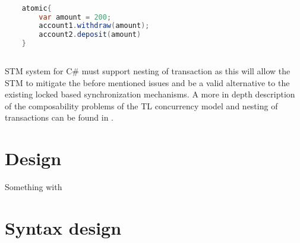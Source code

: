\begin{lstlisting}[label=lst:stm_nested_transactions_real,
  caption={Dynamically nested transactions},
  language=Java,  
  showspaces=false,
  showtabs=false,
  breaklines=true,
  showstringspaces=false,
  breakatwhitespace=true,
  commentstyle=\color{greencomments},
  keywordstyle=\color{bluekeywords},
  stringstyle=\color{redstrings},
  morekeywords={atomic, retry, orElse, var}]  % Start your code-block

	atomic{
		var amount = 200;
		account1.withdraw(amount);
		account2.deposit(amount)
	}
       
\end{lstlisting}

\ac{STM} system for C\# must support nesting of transaction as this will allow the \ac{STM} to mitigate the before mentioned issues and be a valid alternative to the existing locked based synchronization mechanisms. A more in depth description of the composability problems of the \ac{TL} concurrency model and nesting of transactions can be found in \cite{dpt907e14trending}.



\section{Design}
\label{sec:stm_design}
Something with\cite[p. 1]{harris2003language}



\section{Syntax design}


